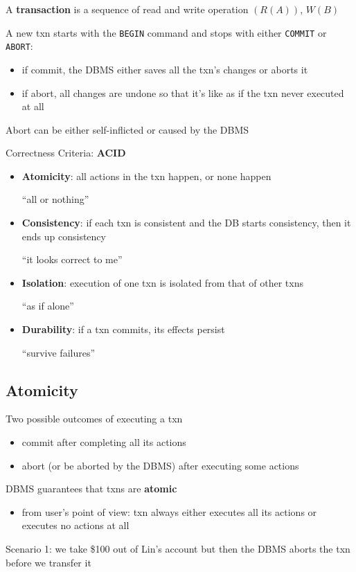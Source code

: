\documentclass[11pt]{article}
\begin{document}
A \textbf{transaction} is a sequence of read and write operation \((R(A))\), \(W(B)\)

A new txn starts with the \texttt{BEGIN} command and stops with either \texttt{COMMIT} or \texttt{ABORT}:
\begin{itemize}
\item if commit, the DBMS either saves all the txn's changes or aborts it
\item if abort, all changes are undone so that it's like as if the txn never executed at all
\end{itemize}

Abort can be either self-inflicted or caused by the DBMS

Correctness Criteria: \textbf{ACID}
\begin{itemize}
\item \textbf{Atomicity}: all actions in the txn happen, or none happen

``all or nothing''
\item \textbf{Consistency}: if each txn is consistent and the DB starts consistency, then it ends up
consistency

``it looks correct to me''
\item \textbf{Isolation}: execution of one txn is isolated from that of other txns

``as if alone''
\item \textbf{Durability}: if a txn commits, its effects persist

``survive failures''
\end{itemize}
\subsection{Atomicity}
\label{sec:org3f6c4a0}
Two possible outcomes of executing a txn
\begin{itemize}
\item commit after completing all its actions
\item abort (or be aborted by the DBMS) after executing some actions
\end{itemize}

DBMS guarantees that txns are \textbf{atomic}
\begin{itemize}
\item from user's point of view: txn always either executes all its actions or executes no actions
at all
\end{itemize}

Scenario 1: we take \$100 out of Lin's account but then the DBMS aborts the txn before we
transfer it
\end{document}
